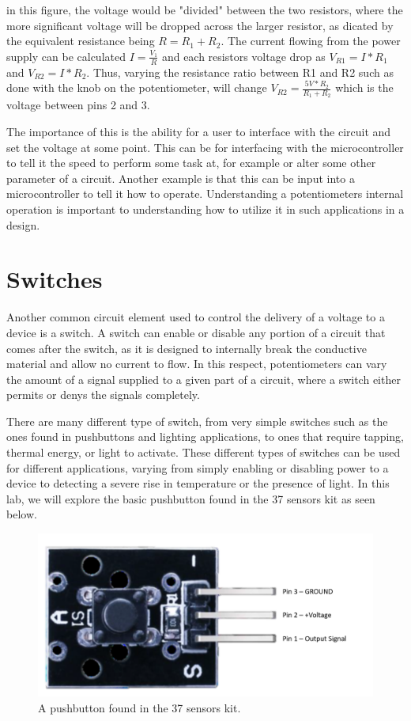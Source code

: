 \documentclass[12pt]{article}
\begin{document}
in this figure, the voltage would be "divided" between the two resistors, where the more significant voltage will be dropped across the larger resistor, as dicated by the equivalent resistance being $R = R_{1} + R_{2}$. The current flowing from the power supply can be calculated $I = \frac{V_{1}}{R}$ and each resistors voltage drop as $V_{R1} = I * R_{1}$ and $V_{R2} = I * R_{2}$. Thus, varying the resistance ratio between R1 and R2 such as done with the knob on the potentiometer, will change $V_{R2} = \frac{5V * R_{2}}{R_{1}+R_{2}}$ which is the voltage between pins 2 and 3.

The importance of this is the ability for a user to interface with the circuit and set the voltage at some point. This can be for interfacing with the microcontroller to tell it the speed to perform some task at, for example or alter some other parameter of a circuit. Another example is that this can be input into a microcontroller to tell it how to operate. Understanding a potentiometers internal operation is important to understanding how to utilize it in such applications in a design.

\section{Switches}

Another common circuit element used to control the delivery of a voltage to a device is a switch. A switch can enable or disable any portion of a circuit that comes after the switch, as it is designed to internally break the conductive material and allow no current to flow. In this respect, potentiometers can vary the amount of a signal supplied to a given part of a circuit, where a switch either permits or denys the signals completely.

There are many different type of switch, from very simple switches such as the ones found in pushbuttons and lighting applications, to ones that require tapping, thermal energy, or light to activate. These different types of switches can be used for different applications, varying from simply enabling or disabling power to a device to detecting a severe rise in temperature or the presence of light. In this lab, we will explore the basic pushbutton found in the 37 sensors kit as seen below.

\begin{figure}[H]
    \centering
    \includegraphics[width=12cm]{photos/prelim/pushbutton.PNG}
    \caption{A pushbutton found in the 37 sensors kit.}
\end{figure}
\end{document}

